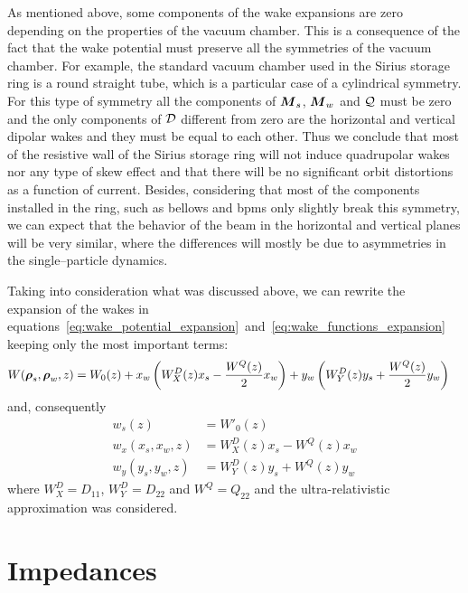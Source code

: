    As mentioned above, some components of the wake expansions are zero depending on the properties of the vacuum chamber. This is a consequence of the fact that the wake potential must preserve all the symmetries of the vacuum chamber.
    For example, the standard vacuum chamber used in the Sirius storage ring is a round straight tube, which is a particular case of a cylindrical symmetry. For this type of symmetry all the components of $\boldsymbol{M}_s$, $\boldsymbol{M}_w$ and $\mathcal{Q}$ must be zero and the only components of $\mathcal{D}$ different from zero are the horizontal and vertical dipolar wakes and they must be equal to each other. Thus we conclude that most of the resistive wall of the Sirius storage ring will not induce quadrupolar wakes nor any type of skew effect and that there will be no significant orbit distortions as a function of current. Besides, considering that most of the components installed in the ring, such as bellows and \glspl{bpm} only slightly break this symmetry, we can expect that the behavior of the beam in the horizontal and vertical planes will be very similar, where the differences will mostly be due to asymmetries in the single--particle dynamics.

    Taking into consideration what was discussed above, we can rewrite the expansion of the wakes in equations~\eqref{eq:wake_potential_expansion}~and~\eqref{eq:wake_functions_expansion} keeping only the most important terms:
    \begin{align}\label{eq:important_wake_potential}
  	  	W(\boldsymbol{\rho}_s, \boldsymbol{\rho}_w, z) &=
	  		W_0(z) +
			x_w\left(W^D_X(z)x_s - \frac{W^Q(z)}{2}x_w\right) +
			y_w\left(W^D_Y(z)y_s + \frac{W^Q(z)}{2}y_w\right)
    \end{align}
    and, consequently
    \begin{align}\label{eq:important_wakes}\nonumber
  		w_s(z) &= W'_0(z) \\
		w_x(x_s, x_w, z) &= W^D_X(z)x_s - W^Q(z)x_w \\\nonumber
		w_y(y_s, y_w, z) &= W^D_Y(z)y_s + W^Q(z)y_w
    \end{align}
    where $W^D_X = D_{11}$, $W^D_Y = D_{22}$ and $W^Q = Q_{22}$ and the ultra-relativistic approximation was considered.

\section{Impedances}\label{sec:impedances}

